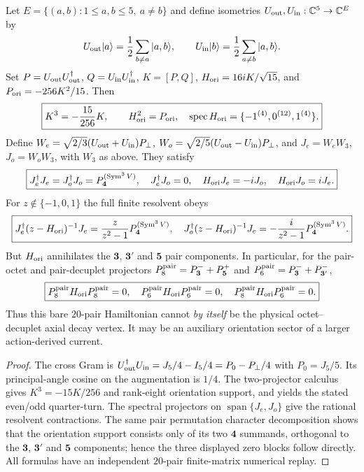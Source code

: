 \documentclass[12pt,a4paper]{article}
\begin{document}
\begin{proposition}
\label{p11:prop:v369-oriented-core-auxiliary}
Let $E=\{(a,b):1\le a,b\le5,\ a\ne b\}$ and define isometries
$U_{\rm out},U_{\rm in}:\mathbb C^5\to\mathbb C^E$ by
\[
 U_{\rm out}|a\rangle={1\over2}\sum_{b\ne a}|a,b\rangle,
 \qquad U_{\rm in}|b\rangle={1\over2}\sum_{a\ne b}|a,b\rangle.
\]
Set $P=U_{\rm out}U_{\rm out}^\dagger$,
$Q=U_{\rm in}U_{\rm in}^\dagger$,
$K=[P,Q]$, $H_{\rm ori}=16iK/\sqrt{15}$, and
$P_{\rm ori}=-256K^2/15$.  Then
\[
 \boxed{K^3=-{15\over256}K,\qquad
 H_{\rm ori}^2=P_{\rm ori},\quad
 \operatorname{spec}H_{\rm ori}=\{-1^{(4)},0^{(12)},1^{(4)}\}.}
\]
Define $W_e=\sqrt{2/3}(U_{\rm out}+U_{\rm in})P_\perp$,
$W_o=\sqrt{2/5}(U_{\rm out}-U_{\rm in})P_\perp$, and
$J_e=W_eW_3$, $J_o=W_oW_3$, with $W_3$ as above.  They satisfy
\[
 \boxed{J_e^\dagger J_e=J_o^\dagger J_o=P_{\mathbf4}^{(\operatorname{Sym}^3V)},\quad
 J_e^\dagger J_o=0,\quad
 H_{\rm ori}J_e=-iJ_o,\quad H_{\rm ori}J_o=iJ_e.}
\]
For $z\not\in\{-1,0,1\}$ the full finite resolvent obeys
\[
 \boxed{J_e^\dagger(z-H_{\rm ori})^{-1}J_e
 ={z\over z^2-1}P_{\mathbf4}^{(\operatorname{Sym}^3V)},\quad
 J_o^\dagger(z-H_{\rm ori})^{-1}J_e
 =-{i\over z^2-1}P_{\mathbf4}^{(\operatorname{Sym}^3V)}.}
\]
But $H_{\rm ori}$ annihilates the $\mathbf3$, $\mathbf3'$ and
$\mathbf5$ pair components.  In particular, for the pair-octet and
pair-decuplet projectors
$P_8^{\rm pair}=P_{\mathbf3}^{-}+P_{\mathbf5}^{+}$ and
$P_6^{\rm pair}=P_{\mathbf3}^{-}+P_{\mathbf3'}^{-}$,
\[
 \boxed{P_8^{\rm pair}H_{\rm ori}P_8^{\rm pair}=0,\quad
 P_6^{\rm pair}H_{\rm ori}P_6^{\rm pair}=0,\quad
 P_8^{\rm pair}H_{\rm ori}P_6^{\rm pair}=0.}
\]
Thus this bare $20$-pair Hamiltonian cannot \emph{by itself} be the
physical octet--decuplet axial decay vertex.  It may be an auxiliary
orientation sector of a larger action-derived current.
\end{proposition}
\begin{proof}
The cross Gram is $U_{\rm out}^\dagger U_{\rm in}
=J_5/4-I_5/4=P_0-P_\perp/4$ with $P_0=J_5/5$.
Its principal-angle cosine on the augmentation is $1/4$.
The two-projector calculus gives $K^3=-15K/256$ and rank-eight
orientation support, and yields the stated even/odd quarter-turn.
The spectral projectors on $\operatorname{span}\{J_e,J_o\}$
give the rational resolvent contractions.  The same pair
permutation character decomposition shows that the orientation
support consists only of its two $\mathbf4$ summands, orthogonal to
the $\mathbf3$, $\mathbf3'$ and $\mathbf5$ components; hence the
three displayed zero blocks follow directly.  All formulas have an
independent $20$-pair finite-matrix numerical replay.
\end{proof}
\end{document}
